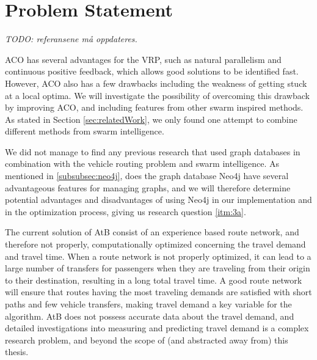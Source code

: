 \section{Problem Statement}
\label{sec:problemStatement}

\emph{\color{blue} TODO: referansene må oppdateres.}


ACO has several advantages for the VRP, such as natural parallelism and continuous positive feedback, which allows good solutions to be identified fast. However, ACO also has a few drawbacks including the weakness of getting stuck at a local optima. We will investigate the possibility of overcoming this drawback by improving ACO, and including features from other swarm inspired methods. As stated in Section \vref{sec:relatedWork}, we only found one attempt to combine different methods from swarm intelligence.%

We did not manage to find any previous research that used graph databases in combination with the vehicle routing problem and swarm intelligence. As mentioned in \vref{subsubsec:neo4j}, does the graph database Neo4j \citep{website:neo4j} have several advantageous features for managing graphs, and we will therefore determine potential advantages and disadvantages of using Neo4j in our implementation and in the optimization process, giving us research question \vref{itm:3a}.


The current solution of AtB consist of an experience based route network, and therefore not properly, computationally optimized concerning the travel demand and travel time. When a route network is not properly optimized, it can lead to a large number of transfers for passengers when they are traveling from their origin to their destination, resulting in a long total travel time. A good route network will ensure that routes having the most traveling demands are satisfied with short paths and few vehicle transfers, making travel demand a key variable for the algorithm. AtB\citep{website:atb} does not possess accurate data about the travel demand, and detailed investigations into measuring and predicting travel demand is a complex research problem, and beyond the scope of (and abstracted away\citep{cohen88} from) this thesis. 

